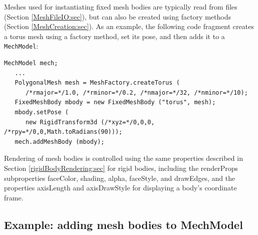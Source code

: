 %
Meshes used for instantiating fixed mesh bodies are typically read
from files (Section \ref{MeshFileIO:sec}), but can also be created
using factory methods (Section \ref{MeshCreation:sec}).  As an
example, the following code fragment creates a torus mesh using a
factory method, set its pose, and then adds it to a {\tt MechModel}:
%
\begin{lstlisting}[]
   MechModel mech;
   ...
   PolygonalMesh mesh = MeshFactory.createTorus (
      /*rmajor=*/1.0, /*rminor=*/0.2, /*nmajor=*/32, /*nminor=*/10);
   FixedMeshBody mbody = new FixedMeshBody ("torus", mesh);
   mbody.setPose (
      new RigidTransform3d (/*xyz=*/0,0,0, /*rpy=*/0,0,Math.toRadians(90)));
   mech.addMeshBody (mbody);
\end{lstlisting}
%

Rendering of mesh bodies is controlled using the same properties
described in Section \ref{rigidBodyRendering:sec} for rigid bodies,
including the {\sf renderProps} subproperties {\sf faceColor}, {\sf
shading}, {\sf alpha}, {\sf faceStyle}, and {\sf drawEdges}, and the
properties {\sf axisLength} and {\sf axisDrawStyle} for displaying a
body's coordinate frame.

\subsection{Example: adding mesh bodies to MechModel}
\label{FixedMeshesExample:sec}

